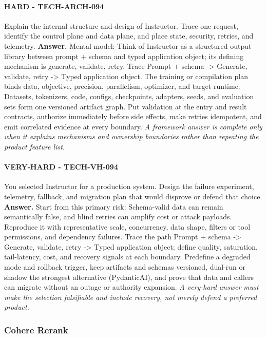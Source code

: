 \paragraph{HARD - TECH-ARCH-094} Explain the internal structure and design of Instructor. Trace one request, identify the control plane and data plane, and place state, security, retries, and telemetry.
\textbf{Answer.} Mental model: Think of Instructor as a structured-output library between prompt + schema and typed application object; its defining mechanism is generate, validate, retry. Trace Prompt + schema -> Generate, validate, retry -> Typed application object. The training or compilation plan binds data, objective, precision, parallelism, optimizer, and target runtime. Datasets, tokenizers, code, configs, checkpoints, adapters, seeds, and evaluation sets form one versioned artifact graph. Put validation at the entry and result contracts, authorize immediately before side effects, make retries idempotent, and emit correlated evidence at every boundary.
\textit{A framework answer is complete only when it explains mechanisms and ownership boundaries rather than repeating the product feature list.}
\paragraph{VERY-HARD - TECH-VH-094} You selected Instructor for a production system. Design the failure experiment, telemetry, fallback, and migration plan that would disprove or defend that choice.
\textbf{Answer.} Start from this primary risk: Schema-valid data can remain semantically false, and blind retries can amplify cost or attack payloads. Reproduce it with representative scale, concurrency, data shape, filters or tool permissions, and dependency failures. Trace the path Prompt + schema -> Generate, validate, retry -> Typed application object; define quality, saturation, tail-latency, cost, and recovery signals at each boundary. Predefine a degraded mode and rollback trigger, keep artifacts and schemas versioned, dual-run or shadow the strongest alternative (PydanticAI), and prove that data and callers can migrate without an outage or authority expansion.
\textit{A very-hard answer must make the selection falsifiable and include recovery, not merely defend a preferred product.}
\subsubsection*{Cohere Rerank}
